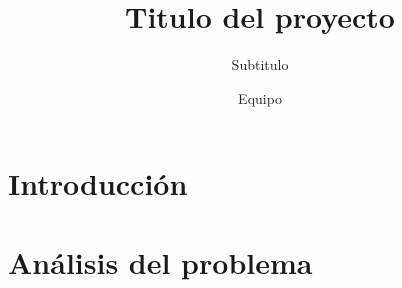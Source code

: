 \documentclass[oneside,10pt]{book}
\title{Titulo del proyecto}
\subtitle{Subtitulo}
\author{Equipo}
\begin{document}
\maketitle
\thispagestyle{empty}


\tableofcontents



\chapter{Introducción}


\chapter{Análisis del problema}
\pagebreak
{}

	
\end{document}
